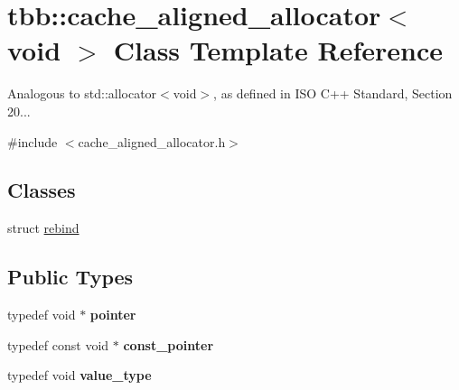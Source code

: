 \hypertarget{classtbb_1_1cache__aligned__allocator_3_01void_01_4}{}\section{tbb\+:\+:cache\+\_\+aligned\+\_\+allocator$<$ void $>$ Class Template Reference}
\label{classtbb_1_1cache__aligned__allocator_3_01void_01_4}


Analogous to std\+::allocator$<$void$>$, as defined in I\+S\+O C++ Standard, Section 20...  




{\ttfamily \#include $<$cache\+\_\+aligned\+\_\+allocator.\+h$>$}

\subsection*{Classes}
\begin{DoxyCompactItemize}
\item 
struct \hyperlink{structtbb_1_1cache__aligned__allocator_3_01void_01_4_1_1rebind}{rebind}
\end{DoxyCompactItemize}
\subsection*{Public Types}
\begin{DoxyCompactItemize}
\item 
\hypertarget{classtbb_1_1cache__aligned__allocator_3_01void_01_4_a630325567e2ede3937a0d2e0f2da6a3f}{}typedef void $\ast$ {\bfseries pointer}\label{classtbb_1_1cache__aligned__allocator_3_01void_01_4_a630325567e2ede3937a0d2e0f2da6a3f}

\item 
\hypertarget{classtbb_1_1cache__aligned__allocator_3_01void_01_4_a36f63efa0a37d205705b9d5944432864}{}typedef const void $\ast$ {\bfseries const\+\_\+pointer}\label{classtbb_1_1cache__aligned__allocator_3_01void_01_4_a36f63efa0a37d205705b9d5944432864}

\item 
\hypertarget{classtbb_1_1cache__aligned__allocator_3_01void_01_4_af7f973d0bb12319600505cf9c1fb35b0}{}typedef void {\bfseries value\+\_\+type}\label{classtbb_1_1cache__aligned__allocator_3_01void_01_4_af7f973d0bb12319600505cf9c1fb35b0}

\end{DoxyCompactItemize}


